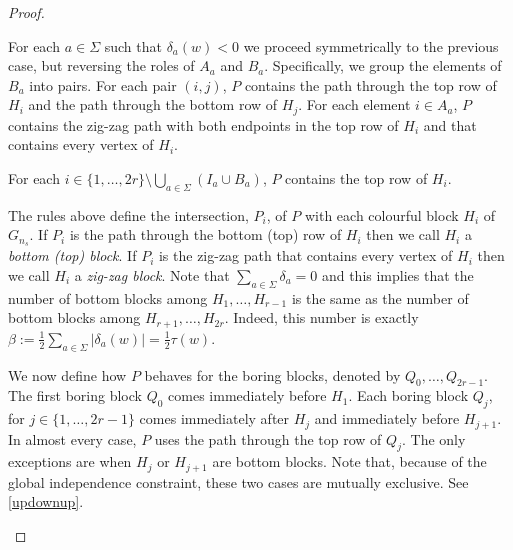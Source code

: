 \documentclass{patmorin}
\begin{document}
\begin{proof}
\begin{compactenum}
        \item For each $a\in\Sigma$ such that $\delta_a(w)<0$ we proceed symmetrically to the previous case, but reversing the roles of $A_a$ and $B_a$.  Specifically, we group the elements of $B_a$ into pairs.  For each pair $(i,j)$, $P$ contains the path through the top row of $H_i$ and the path through the bottom row of $H_j$.  For each element $i\in A_a$, $P$ contains the zig-zag path with both endpoints in the top row of $H_i$ and that contains every vertex of $H_i$.

        \item For each $i\in\{1,\ldots,2r\}\setminus\bigcup_{a\in\Sigma}(I_a\cup B_a)$, $P$ contains the top row of $H_i$.
    \end{compactenum}
    The rules above define the intersection, $P_i$, of $P$ with each colourful block $H_i$ of $G_{n_s}$.  If $P_i$ is the path through the bottom (top) row of $H_i$ then we call $H_i$ a \emph{bottom (top) block}.  If $P_i$ is the zig-zag path that contains every vertex of $H_i$ then we call $H_i$ a \emph{zig-zag block}.  Note that $\sum_{a\in\Sigma} \delta_a = 0$ and this implies that the number of bottom blocks among $H_1,\ldots,H_{r-1}$ is the same as the number of bottom blocks among $H_{r+1},\ldots,H_{2r}$.  Indeed, this number is exactly $\beta:=\tfrac{1}{2}\sum_{a\in\Sigma} |\delta_a(w)|=\tfrac{1}{2}\tau(w)$.

    We now define how $P$ behaves for the boring blocks, denoted by  $Q_0,\ldots,Q_{2r-1}$. The first boring block $Q_0$ comes immediately before $H_1$. Each boring block $Q_j$, for $j\in\{1,\ldots,2r-1\}$ comes immediately after $H_j$ and immediately before $H_{j+1}$.  In almost every case, $P$ uses the path through the top row of $Q_j$.  The only exceptions are when $H_j$ or $H_{j+1}$ are bottom blocks. Note that, because of the global independence constraint, these two cases are mutually exclusive. See \cref{updownup}.

    \begin{figure}
    \end{figure}


\end{proof}
\end{document}
